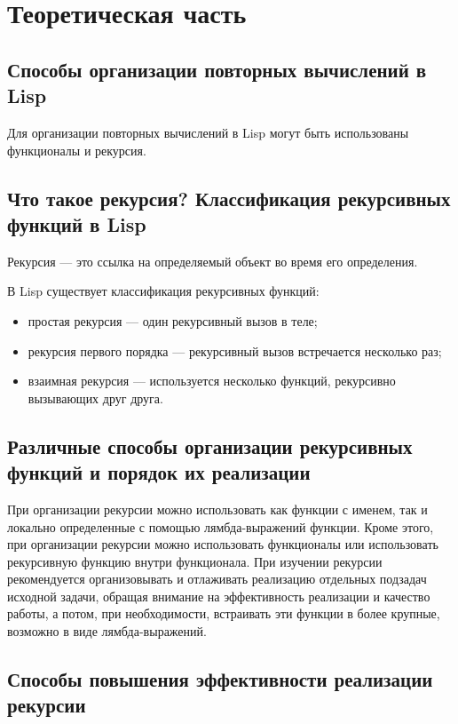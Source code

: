 \documentclass[a4paper,oneside,12pt]{extreport}
\begin{document}
\section*{Теоретическая часть}

\subsection*{Способы организации повторных вычислений в Lisp}

Для организации повторных вычислений в Lisp могут быть использованы функционалы и рекурсия.

\subsection*{Что такое рекурсия? Классификация рекурсивных функций в Lisp}

Рекурсия — это ссылка на определяемый объект во время его определения.

В Lisp существует классификация рекурсивных функций:
\begin{itemize}
	\item простая рекурсия — один рекурсивный вызов в теле;
	\item рекурсия первого порядка — рекурсивный вызов встречается несколько раз;
	\item взаимная рекурсия — используется несколько функций, рекурсивно вызывающих друг друга.
\end{itemize}

\subsection*{Различные способы организации рекурсивных функций и порядок их реализации}

При организации рекурсии можно использовать как функции с именем, так и локально определенные с помощью лямбда-выражений функции.
Кроме этого, при организации рекурсии можно использовать функционалы или использовать рекурсивную функцию внутри функционала.
При изучении рекурсии рекомендуется организовывать и отлаживать реализацию отдельных подзадач исходной задачи, обращая внимание на эффективность реализации и качество работы, а потом, при необходимости, встраивать эти функции в более крупные, возможно в виде лямбда-выражений.

\subsection*{Способы повышения эффективности реализации рекурсии}
\end{document}
